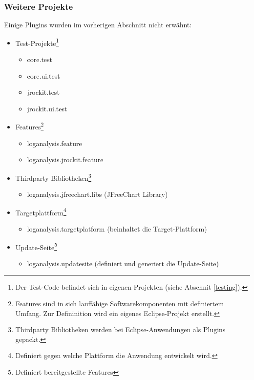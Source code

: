 \subsubsection{Weitere Projekte}
Einige Plugins wurden im vorherigen Abschnitt nicht erwähnt:
\begin{itemize}
	\item Test-Projekte\footnote{Der Test-Code befindet sich in eigenen Projekten (siehe Abschnit \ref{testing}).}
		\begin{itemize}
			\item core.test
			\item core.ui.test
			\item jrockit.test
			\item jrockit.ui.test
		\end{itemize}
	\item  Features\footnote{Features sind in sich lauffähige Softwarekomponenten mit definiertem Umfang. Zur Defininition wird ein eigenes Eclipse-Projekt erstellt.}
		\begin{itemize}
			\item loganalysis.feature
			\item loganalysis.jrockit.feature
		\end{itemize}
	\item  Thirdparty Bibliotheken\footnote{Thirdparty Bibliotheken werden bei Eclipse-Anwendungen als Plugins gepackt.}
		\begin{itemize}
			\item  loganalysis.jfreechart.libs (JFreeChart Library)
		\end{itemize}
	\item  Targetplattform\footnote{Definiert gegen welche Plattform die Anwendung entwickelt wird.}
		\begin{itemize}
			\item  loganalysis.targetplatform (beinhaltet die Target-Plattform)
		\end{itemize}
	\item  Update-Seite\footnote{Definiert bereitgestellte Features}
		\begin{itemize}
			\item loganalysis.updatesite (definiert und generiert die Update-Seite)
		\end{itemize}
\end{itemize}

